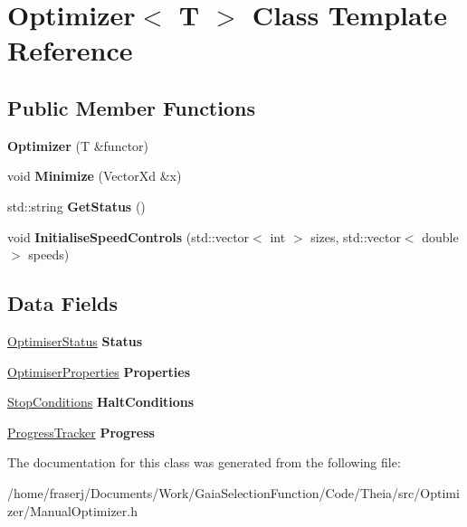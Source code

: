 \hypertarget{classOptimizer}{}\section{Optimizer$<$ T $>$ Class Template Reference}
\label{classOptimizer}
\subsection*{Public Member Functions}
\begin{DoxyCompactItemize}
\item 
\mbox{\label{classOptimizer_ac0e9c13ba2d8779c27dcf1dee8ab0306}} 
{\bfseries Optimizer} (T \&functor)
\item 
\mbox{\label{classOptimizer_a1a87a01f13187f0aa30e5fbed82746d4}} 
void {\bfseries Minimize} (Vector\+Xd \&x)
\item 
\mbox{\label{classOptimizer_a9bd0631315cd436b781b13a893b43570}} 
std\+::string {\bfseries Get\+Status} ()
\item 
\mbox{\label{classOptimizer_a5764da74cea367e4fcfb109457775925}} 
void {\bfseries Initialise\+Speed\+Controls} (std\+::vector$<$ int $>$ sizes, std\+::vector$<$ double $>$ speeds)
\end{DoxyCompactItemize}
\subsection*{Data Fields}
\begin{DoxyCompactItemize}
\item 
\mbox{\label{classOptimizer_abe6112b42cbdc2d21d357eca8e6cddcf}} 
\hyperlink{structOptimiserStatus}{Optimiser\+Status} {\bfseries Status}
\item 
\mbox{\label{classOptimizer_a21a7d8f0ee189158efb5a5c45844b671}} 
\hyperlink{structOptimiserProperties}{Optimiser\+Properties} {\bfseries Properties}
\item 
\mbox{\label{classOptimizer_af7371734bfa497aeef60185738d89a8e}} 
\hyperlink{structStopConditions}{Stop\+Conditions} {\bfseries Halt\+Conditions}
\item 
\mbox{\label{classOptimizer_aecc0f0b358ac630cc78fc40a3d737b53}} 
\hyperlink{structProgressTracker}{Progress\+Tracker} {\bfseries Progress}
\end{DoxyCompactItemize}


The documentation for this class was generated from the following file\+:\begin{DoxyCompactItemize}
\item 
/home/fraserj/\+Documents/\+Work/\+Gaia\+Selection\+Function/\+Code/\+Theia/src/\+Optimizer/Manual\+Optimizer.\+h\end{DoxyCompactItemize}
